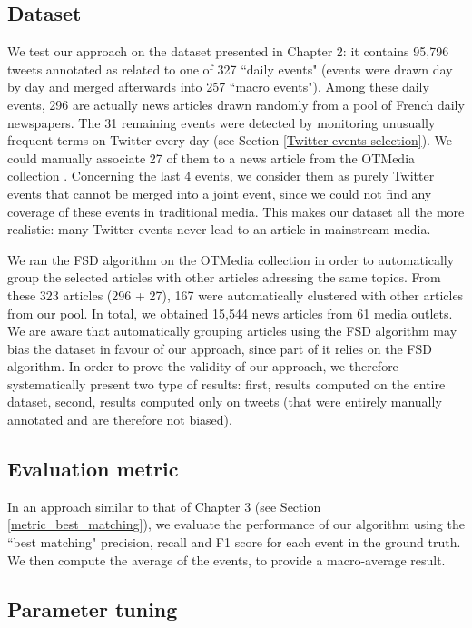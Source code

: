 \subsection{Dataset}
We test our approach on the dataset presented in Chapter 2: it contains 95,796 tweets annotated as related to one of 327 ``daily events" (events were drawn day by day and merged afterwards into 257 ``macro events"). Among these daily events, 296 are actually news articles drawn randomly from a pool of French daily newspapers. The 31 remaining events were detected by monitoring unusually frequent terms on Twitter every day (see Section \ref{Twitter events selection}). We could manually associate 27 of them to a news article from the OTMedia collection \citep{herve2019otmedia}. Concerning the last 4 events, we consider them as purely Twitter events that cannot be merged into a joint event, since we could not find any coverage of these events in traditional media. This makes our dataset all the more realistic: many Twitter events never lead to an article in mainstream media.

We ran the FSD algorithm on the OTMedia collection in order to automatically group the selected articles with other articles adressing the same topics. From these 323 articles (296 + 27), 167 were automatically clustered with other articles from our pool. In total, we obtained 15,544 news articles from 61 media outlets. We are aware that automatically grouping articles using the FSD algorithm may bias the dataset in favour of our approach, since part of it relies on the FSD algorithm. In order to prove the validity of our approach, we therefore systematically present two type of results: first, results computed on the entire dataset, second, results computed only on tweets (that were entirely manually annotated and are therefore not biased).

\subsection{Evaluation metric}
In an approach similar to that of Chapter 3 (see Section \ref{metric_best_matching}), we evaluate the performance of our algorithm using the ``best matching" precision, recall and F1 score \citep{yang1998study} for each event in the ground truth. We then compute the average of the events, to provide a macro-average result.

\subsection{Parameter tuning}

